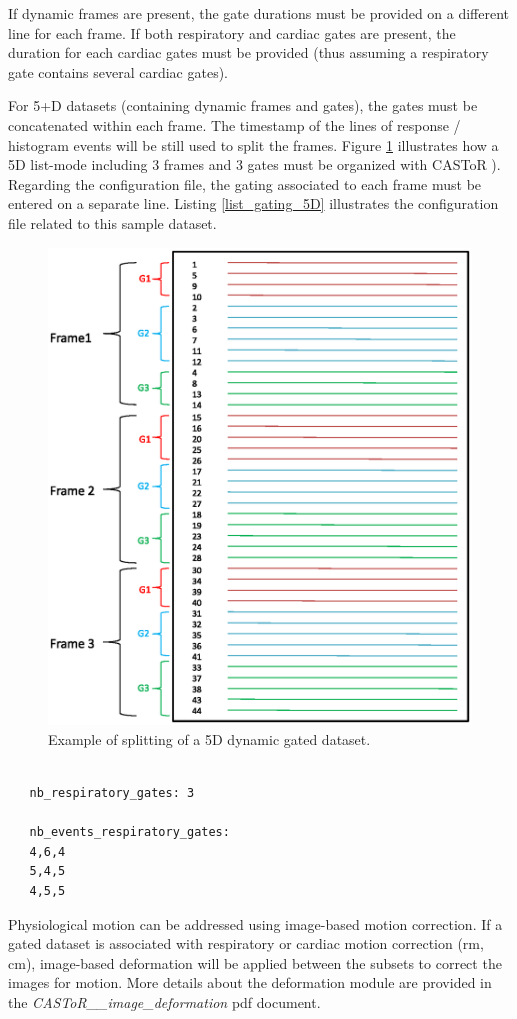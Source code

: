 \documentclass[a4paper, 11pt]{article}
\begin{document}
If dynamic frames are present, the gate durations must be provided on a different line for each frame. If both respiratory and cardiac gates are present, the duration for each cardiac gates must be provided (thus assuming a respiratory gate contains several cardiac gates).

\bigskip

For 5+D datasets (containing dynamic frames and gates), the gates must be concatenated within each frame. The timestamp of the lines of response / histogram events will be still used to split the frames. Figure \ref{fig_gating_5D} illustrates how a 5D list-mode including 3 frames and 3 gates must be organized with CASToR ). Regarding the configuration file, the gating associated to each frame must be entered on a separate line. Listing \ref{list_gating_5D} illustrates the configuration file related to this sample dataset.


\bigskip
\begin{figure} [h!]
\centering
\includegraphics[width=0.49\columnwidth]{./figures/dynamic_gated_5D.eps}
\caption{Example of splitting of a 5D dynamic gated dataset.}
\label{fig_gating_5D}
\end{figure}


\begin{lstlisting}[label={list_gating_5D},caption= Setup of the gating file related to the dynamic dataset in figure \ref{fig_gating_5D}).]

   nb_respiratory_gates: 3
   
   nb_events_respiratory_gates: 
   4,6,4
   5,4,5
   4,5,5

\end{lstlisting}    


Physiological motion can be addressed using image-based motion correction. If a gated dataset is associated with respiratory or cardiac motion correction (rm, cm), image-based deformation will be applied between the subsets to correct the images for motion. More details about the deformation module are provided in the \textit{CASToR\_\_image\_deformation} pdf document.
 
\end{document}
